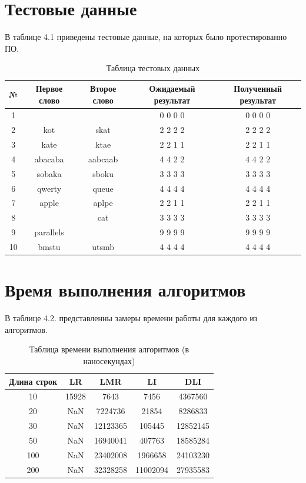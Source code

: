 \documentclass[12pt]{report}
\begin{document}
\section{Тестовые данные}

В таблице 4.1 приведены тестовые данные, на которых было протестированно ПО.

\begin{table}[h]
	\begin{center}
		\begin{tabular}{|c c c c c|} 
			\hline
			№ & Первое слово & Второе слово & Ожидаемый результат & Полученный результат \\ [0.8ex] 
			\hline
			1 &  &  & 0 0 0 0 & 0 0 0 0\\
			\hline
			2 & kot & skat & 2 2 2 2 & 2 2 2 2\\
			\hline
			3 & kate & ktae & 2 2 1 1 & 2 2 1 1\\
			\hline
			4 & abacaba & aabcaab & 4 4 2 2 & 4 4 2 2\\
			\hline
			5 & sobaka & sboku & 3 3 3 3 & 3 3 3 3\\
			\hline
			6 & qwerty & queue & 4 4 4 4 & 4 4 4 4\\
			\hline
			7 & apple & aplpe & 2 2 1 1  & 2 2 1 1\\
			\hline
			8 &  & cat & 3 3 3 3 & 3 3 3 3\\
			\hline
			9 & parallels &  & 9 9 9 9 & 9 9 9 9\\
			\hline
			10 & bmstu & utsmb & 4 4 4 4 & 4 4 4 4\\
			\hline
		\end{tabular}
		\caption{Таблица тестовых данных}
	\end{center}
\end{table}


\section{Время выполнения алгоритмов}

В таблице 4.2. представленны замеры времени работы для каждого из алгоритмов.
\begin{table} [h!]
	\begin{center}
		\begin{tabular}{|c c c c c|} 
		 	\hline
			Длина строк & LR & LMR & LI & DLI \\  
		 	\hline
		 	10 & 15928 & 7643 & 7456 & 4367560\\
		 	\hline
		 	20 & NaN & 7224736 & 21854 & 8286833\\
		 	\hline
			30 & NaN & 12123365 & 105445 & 12852145\\
			\hline
			50 & NaN & 16940041 & 407763 & 18585284\\
			\hline
			100 & NaN & 23402008 & 1966658 & 24103230\\
			\hline
			200 & NaN & 32328258 & 11002094 & 27935583\\
			\hline
		\end{tabular}
	\end{center}
	\caption{Таблица времени выполнения алгоритмов (в наносекундах)}
\end{table}
\end{document}
